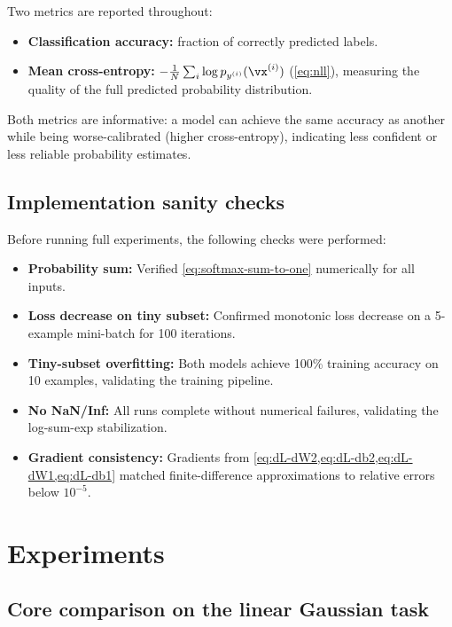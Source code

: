 \documentclass[sigconf,screen,nonacm]{acmart}
\begin{document}
Two metrics are reported throughout:
\begin{itemize}[leftmargin=*]
    \item \textbf{Classification accuracy:} fraction of correctly predicted labels.
    \item \textbf{Mean cross-entropy:} $-\frac{1}{N}\sum_{i} \log p_{y^{(i)}}(\vx^{(i)})$ (\cref{eq:nll}), measuring the quality of the full predicted probability distribution.
\end{itemize}
Both metrics are informative: a model can achieve the same accuracy as another while being worse-calibrated (higher cross-entropy), indicating less confident or less reliable probability estimates.

\subsection{Implementation sanity checks}
\label{sec:sanity}

Before running full experiments, the following checks were performed:
\begin{itemize}[leftmargin=*]
    \item \textbf{Probability sum:} Verified \cref{eq:softmax-sum-to-one} numerically for all inputs.
    \item \textbf{Loss decrease on tiny subset:} Confirmed monotonic loss decrease on a 5-example mini-batch for 100 iterations.
    \item \textbf{Tiny-subset overfitting:} Both models achieve 100\% training accuracy on 10 examples, validating the training pipeline.
    \item \textbf{No NaN/Inf:} All runs complete without numerical failures, validating the log-sum-exp stabilization.
    \item \textbf{Gradient consistency:} Gradients from \cref{eq:dL-dW2,eq:dL-db2,eq:dL-dW1,eq:dL-db1} matched finite-difference approximations to relative errors below $10^{-5}$.
\end{itemize}

\section{Experiments}

\subsection{Core comparison on the linear Gaussian task}
\label{sec:exp-gaussian}
\end{document}
